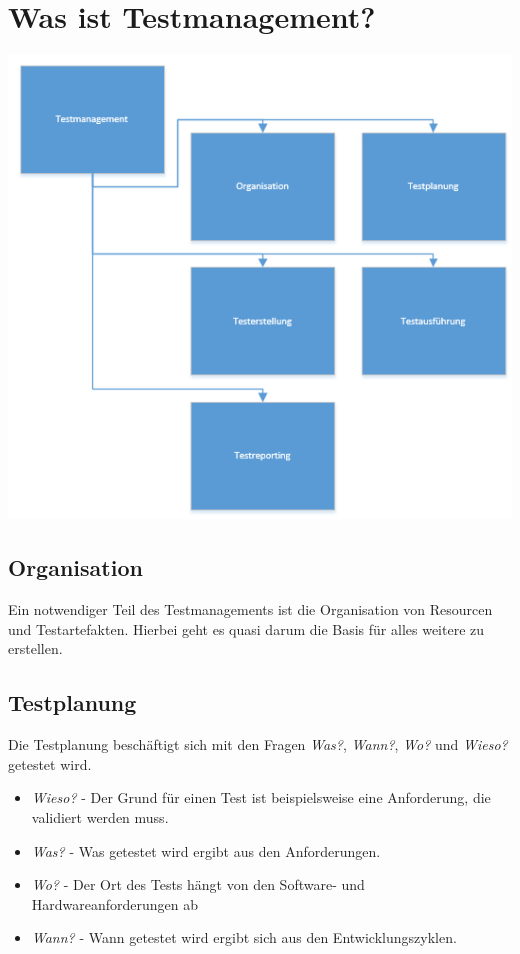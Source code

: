 \chapter{Was ist Testmanagement?}
\includegraphics[]{images/testmanagement}
\section{Organisation}
Ein notwendiger Teil des Testmanagements ist die Organisation von Resourcen und Testartefakten. Hierbei geht es quasi darum die Basis f\"ur alles weitere zu erstellen. 

\section{Testplanung}
Die Testplanung besch\"aftigt sich mit den Fragen \textit{Was?}, \textit{Wann?}, \textit{Wo?} und \textit{Wieso?} getestet wird.

\begin{itemize}
	\item \textit{Wieso?} - Der Grund f\"ur einen Test ist beispielsweise eine Anforderung, die validiert werden muss.
	\item \textit{Was?} - Was getestet wird ergibt aus den Anforderungen. 
	\item \textit{Wo?} - Der Ort des Tests h\"angt von den Software- und Hardwareanforderungen ab
	\item \textit{Wann?} - Wann getestet wird ergibt sich aus den Entwicklungszyklen.
\end{itemize}


